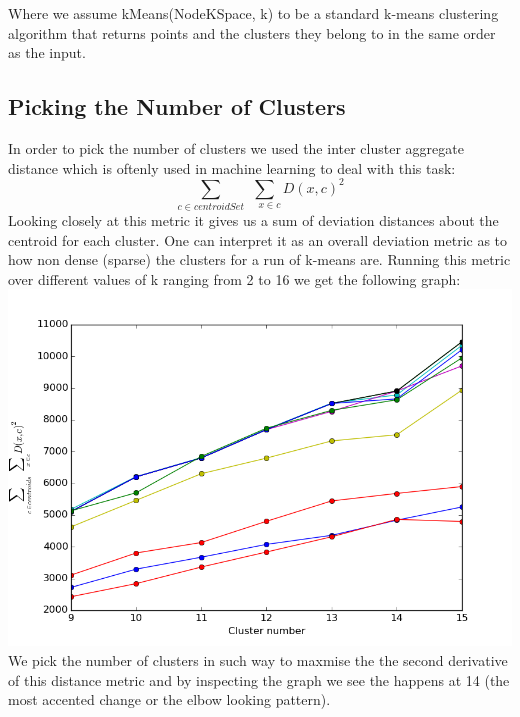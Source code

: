 \documentclass[10pt,twocolumn]{article}
\begin{document}
Where we assume kMeans(NodeKSpace, k) to be a standard k-means clustering algorithm that returns points and the clusters they belong to in the same order as the input. 
\subsection{Picking the Number of Clusters}
In order to pick the number of clusters we used
the inter cluster aggregate  distance which is oftenly used in machine learning to deal with this task:
\[
\sum_{c \in centroidSet} \sum_{\quad x \in c} D(x, c)^{2}
\]
Looking closely at this metric it gives us a sum of deviation distances about the centroid for each cluster. One can interpret it as an overall deviation metric as to how non dense (sparse) the clusters for a run of k-means are. Running this metric over different values of k ranging from 2 to 16 we get the following graph:
\includegraphics[scale=0.4]{pics/m.png}
We pick the number of clusters in such way to maxmise the the second derivative of this distance metric and by inspecting the graph we see the happens at 14 (the most accented change or the elbow looking pattern).
\end{document}

